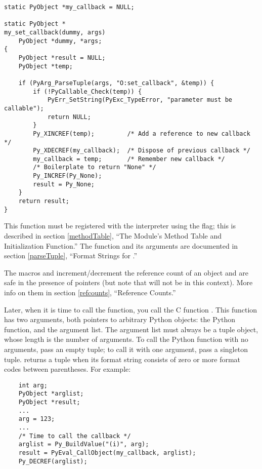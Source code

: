 \documentclass{manual}
\begin{document}
\begin{verbatim}
static PyObject *my_callback = NULL;

static PyObject *
my_set_callback(dummy, args)
    PyObject *dummy, *args;
{
    PyObject *result = NULL;
    PyObject *temp;

    if (PyArg_ParseTuple(args, "O:set_callback", &temp)) {
        if (!PyCallable_Check(temp)) {
            PyErr_SetString(PyExc_TypeError, "parameter must be callable");
            return NULL;
        }
        Py_XINCREF(temp);         /* Add a reference to new callback */
        Py_XDECREF(my_callback);  /* Dispose of previous callback */
        my_callback = temp;       /* Remember new callback */
        /* Boilerplate to return "None" */
        Py_INCREF(Py_None);
        result = Py_None;
    }
    return result;
}
\end{verbatim}

This function must be registered with the interpreter using the
 flag; this is described in section
\ref{methodTable}, ``The Module's Method Table and Initialization
Function.''  The  function and its
arguments are documented in section \ref{parseTuple}, ``Format Strings
for .''

The macros  and 
increment/decrement the reference count of an object and are safe in
the presence of \NULL{} pointers (but note that  will not be 
\NULL{} in this context).  More info on them in section
\ref{refcounts}, ``Reference Counts.''

Later, when it is time to call the function, you call the C function
.  This function has two arguments, both
pointers to arbitrary Python objects: the Python function, and the
argument list.  The argument list must always be a tuple object, whose
length is the number of arguments.  To call the Python function with
no arguments, pass an empty tuple; to call it with one argument, pass
a singleton tuple.   returns a tuple when its
format string consists of zero or more format codes between
parentheses.  For example:

\begin{verbatim}
    int arg;
    PyObject *arglist;
    PyObject *result;
    ...
    arg = 123;
    ...
    /* Time to call the callback */
    arglist = Py_BuildValue("(i)", arg);
    result = PyEval_CallObject(my_callback, arglist);
    Py_DECREF(arglist);
\end{verbatim}
\end{document}
